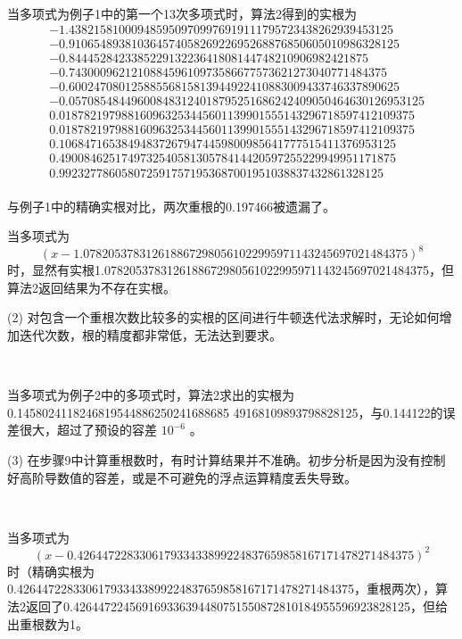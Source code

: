 \begin{example}[]~
	
	当多项式为例子1中的第一个13次多项式时，算法2得到的实根为
	$$
	\begin{aligned}
	& -1.4382158100094859509709976919111795723438262939453125 \\ & -0.91065489381036457405826922695268876850605010986328125 \\  & -0.844452842338522913223641808144748210906982421875 \\ & -0.743000962121088459610973586677573621273040771484375 \\ & -0.60024708012588556815813944922410883009433746337890625 \\ & -0.057085484496008483124018795251686242409050464630126953125 \\ & 0.018782197988160963253445601139901555143296718597412109375 \\ & 0.018782197988160963253445601139901555143296718597412109375 \\ & 0.106847165384948372679474459800985641777515411376953125 \\ & 0.490084625174973254058130578414420597255229949951171875 \\ & 0.9923277860580725917571953687001951038837432861328125 \\
	\end{aligned}
	$$
	
	与例子1中的精确实根对比，两次重根的0.197466被遗漏了。
	
	当多项式为
	$$
	(x - 1.0782053783126188672980561022995971143245697021484375)^8
	$$
	时，显然有实根1.0782053783126188672980561022995971143245697021484375，但算法2返回结果为不存在实根。
	
	
\end{example}

(2) 对包含一个重根次数比较多的实根的区间进行牛顿迭代法求解时，无论如何增加迭代次数，根的精度都非常低，无法达到要求。

\begin{example}[]~
	
	当多项式为例子2中的多项式时，算法2求出的实根为0.1458024118246819544886250241688685
	49168109893798828125，与0.144122的误差很大，超过了预设的容差 $10^{-6}$ 。
	
	
\end{example}

(3) 在步骤9中计算重根数时，有时计算结果并不准确。初步分析是因为没有控制好高阶导数值的容差，或是不可避免的浮点运算精度丢失导致。

\begin{example}[]~
	
	当多项式为
	$$
	(x - 0.426447228330617933433899224837659858167171478271484375)^2
	$$
	时（精确实根为 0.426447228330617933433899224837659858167171478271484375，重根两次），算法2返回了0.426447224569169336394480751550872810184955596923828125，但给出重根数为1。
	
	
\end{example}
